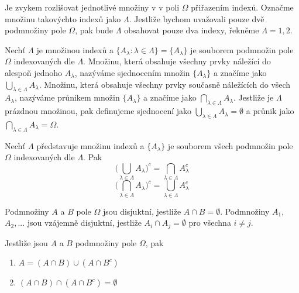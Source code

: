 Je zvykem rozlišovat jednotlivé množiny v v poli $\Omega$ přiřazením indexů. Označme množinu takovýchto indexů jako $\Lambda$. Jestliže bychom uvažovali pouze dvě podmnožiny pole $\Omega$, pak bude $\Lambda$ obsahovat pouze dva indexy, řekněme $\Lambda = {1, 2}$.

\begin{definition} 
Nechť $\Lambda$  je množinou indexů a $\{A_{\lambda}: \lambda \in \Lambda\} = \{A_{\lambda}\}$ je souborem podmnožin pole $\Omega$ indexovaných dle $\Lambda$. Množinu, která obsahuje všechny prvky náležící do alespoň jednoho $A_{\lambda}$, nazýváme sjednocením množin $\{A_{\lambda}\}$ a značíme jako $\bigcup_{\lambda \in \Lambda} A_{\lambda}$. Množinu, která obsahuje všechny prvky současně náležících do všech $A_{\lambda}$, nazýváme průnikem množin $\{A_{\lambda}\}$ a značíme jako $\bigcap_{\lambda \in \Lambda} A_{\lambda}$. Jestliže je $\Lambda$ prázdnou množinou, pak definujeme sjednocení jako $\bigcup_{\lambda \in \Lambda} A_{\lambda} = \emptyset$ a průnik jako $\bigcap_{\lambda \in \Lambda} A_{\lambda} = \Omega$.
\end{definition}

\begin{theorem}
Nechť $\Lambda$ představuje množinu indexů a $\{A_{\lambda}\}$ je souborem všech podmnožin pole $\Omega$ indexovaných dle $\Lambda$. Pak
\begin{equation*}
\Big(\bigcup_{\lambda \in \Lambda} A_{\lambda}\Big)^c = \bigcap_{\lambda \in \Lambda} A^c_{\lambda}
\end{equation*}
\begin{equation*}
\Big(\bigcap_{\lambda \in \Lambda} A_{\lambda}\Big)^c = \bigcup_{\lambda \in \Lambda} A^c_{\lambda}
\end{equation*}
\end{theorem}

\begin{definition}
Podmnožiny $A$ a $B$ pole $\Omega$ jsou disjuktní, jestliže $A \cap B = \emptyset$. Podmnožiny $A_1$, $A_2, ...$ jsou vzájemně disjuktní, jestliže $A_i \cap A_j = \emptyset$ pro všechna $i \not= j$.  
\end{definition}

\begin{theorem}
Jestliže jsou $A$ a $B$ podmnožiny pole $\Omega$, pak
\begin{enumerate}
\item $A = (A \cap B) \cup (A \cap B^c)$
\item $(A \cap B) \cap (A \cap B^c) = \emptyset$
\end{enumerate}
\end{theorem}

